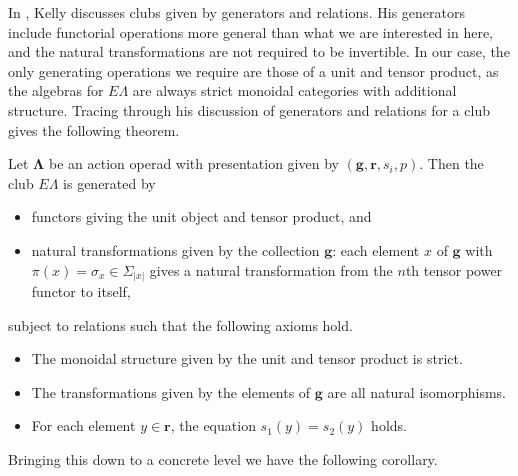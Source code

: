 \documentclass{amsbook} %
\newcommand{\mb}{\mathbf}
\numberwithin{section}{chapter}
\begin{document}
In \cite{kelly_club1}, Kelly discusses clubs given by generators and relations.  His generators include functorial operations more general than what we are interested in here, and the natural transformations are not required to be invertible.  In our case, the only generating operations we require are those of a unit and tensor product, as the algebras for $E\Lambda$ are always strict monoidal categories with additional structure.  Tracing through his discussion of generators and relations for a club gives the following theorem.

\begin{thm}\label{pres1}
Let $\mb{\Lambda}$ be an action operad with presentation given by $(\mathbf{g},\mathbf{r}, s_{i}, p)$.  Then the club $E\Lambda$ is generated by
\begin{itemize}
\item functors giving the unit object and tensor product, and
\item natural transformations given by the collection $\mathbf{g}$:  each element $x$ of $\mathbf{g}$ with $\pi(x) = \sigma_{x} \in \Sigma_{|x|}$ gives a natural transformation from the $n$th tensor power functor to itself,
\end{itemize}
subject to relations such that the following axioms hold.
\begin{itemize}
\item The monoidal structure given by the unit and tensor product is strict.
\item The transformations given by the elements of $\mathbf{g}$ are all natural isomorphisms.
\item For each element $y \in \mathbf{r}$, the equation $s_{1}(y) = s_{2}(y)$ holds.
\end{itemize}
\end{thm}

Bringing this down to a concrete level we have the following corollary.
\end{document}
